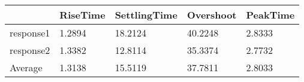 \begin{tabular}{lllll}
  & RiseTime & SettlingTime & Overshoot & PeakTime \\ 
\hline 
response1 & 1.2894 & 18.2124 & 40.2248 & 2.8333 \\ 
response2 & 1.3382 & 12.8114 & 35.3374 & 2.7732 \\ 
Average & 1.3138 & 15.5119 & 37.7811 & 2.8033 \\ 
\hline 
\end{tabular}